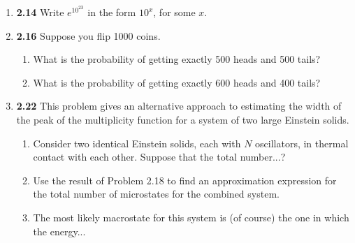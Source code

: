 \documentclass[fleqn]{article}
\begin{document}
\begin{enumerate}
\begin{enumerate}

    \end{enumerate}

    \item \textbf{2.14} Write $e^{10^{23}}$ in the form  $10^x$, for some $x$.


    \item \textbf{2.16} Suppose you flip 1000 coins.
    \begin{enumerate}
      \item What is the probability of getting exactly 500 heads and 500 tails?


      \item What is the probability of getting exactly 600 heads and 400 tails?


    \end{enumerate}

    \item \textbf{2.22} This problem gives an alternative approach to estimating the width of the peak of the multiplicity 
    function for a system of two large Einstein solids.
    \begin{enumerate}
      \item Consider two identical Einstein solids, each with $N$ oscillators, in thermal contact with each other. Suppose
      that the total number...?


      \item Use the result of Problem 2.18 to find an approximation expression for the total number of microstates for 
      the combined system.


      \item The most likely macrostate for this system is (of course) the one in which the energy...


\end{enumerate}
\end{enumerate}
\end{document}
